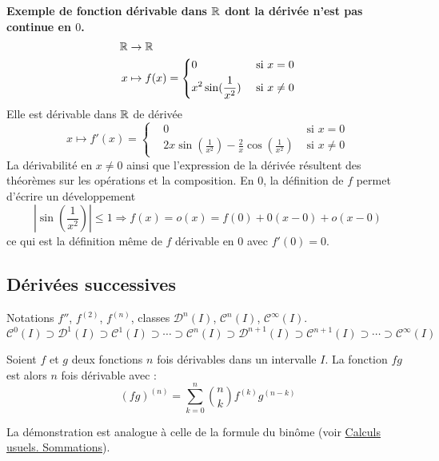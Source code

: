 \label{derpascont}
\textbf{Exemple de fonction dérivable dans $\mathbb{R}$ dont la dérivée n'est pas continue en $0$.}
\begin{align*}
  \mathbb{R} &\rightarrow \mathbb{R} \\
  x  &\mapsto f(x)=
\left\lbrace 
 \begin{aligned}
&0 &\text{ si } x=0 \\
&x^2 \sin(\frac{1}{x^2}) & \text{ si } x\neq0 
 \end{aligned}
\right. 
\end{align*}
Elle est dérivable dans $\mathbb{R}$ de dérivée
\begin{displaymath}
 x\mapsto f'(x)=
\left\lbrace 
 \begin{aligned}
&0 &\text{ si } x=0 \\
&2x \sin(\frac{1}{x^2}) -\frac{2}{x}\cos(\frac{1}{x^2})& \text{ si } x\neq0 
 \end{aligned}
\right.
\end{displaymath}
La dérivabilité en $x\neq 0$ ainsi que l'expression de la dérivée résultent des théorèmes sur les opérations et la composition. En $0$, la définition de $f$ permet d'écrire un développement
\begin{displaymath}
 |\sin(\frac{1}{x^2})|\leq 1 \Rightarrow f(x) =o(x)= f(0)+0(x-0)+o(x-0)
\end{displaymath}
ce qui est la définition même de $f$ dérivable en $0$ avec $f'(0)=0$.


\subsection{Dérivées successives}
Notations $f''$, $f^{(2)}$, $f^{(n)}$, classes $\mathcal{D}^n(I)$, $\mathcal{C}^n(I)$, $\mathcal{C}^{\infty}(I)$.
\begin{displaymath}
  \mathcal{C}^0(I) \supset \mathcal{D}^1(I) \supset \mathcal{C}^1(I) \supset \cdots
  \supset \mathcal{C}^n(I) \supset \mathcal{D}^{n+1}(I) \supset \mathcal{C}^{n+1}(I) \supset \cdots \supset \mathcal{C}^{\infty}(I)
\end{displaymath}

\begin{prop}
 Soient $f$ et $g$ deux fonctions $n$ fois dérivables dans un intervalle $I$. La fonction $fg$ est alors $n$ fois dérivable avec :
\begin{displaymath}
 (fg)^{(n)}=\sum_{k=0}^n\binom{n}{k}f^{(k)}g^{(n-k)}
\end{displaymath}
\end{prop}
\begin{demo}
 La démonstration est analogue à celle de la formule du binôme (voir \href{\baseurl C2003.pdf}{Calculs usuels. Sommations}).
\end{demo}

